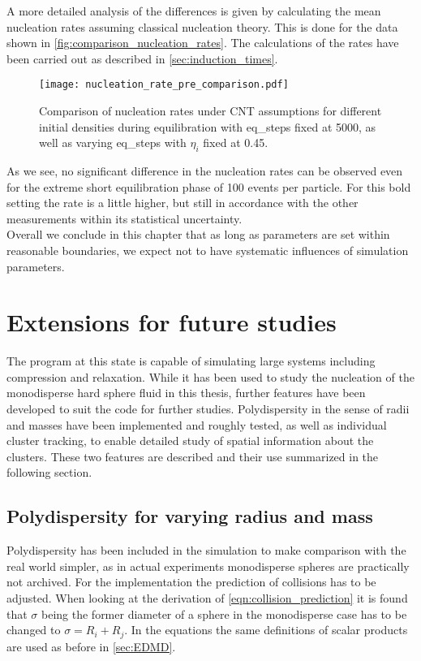 A more detailed analysis of the differences is given by calculating the mean nucleation rates assuming classical nucleation theory. This is done for the data shown in \autoref{fig:comparison_nucleation_rates}. The calculations of the rates have been carried out as described in \autoref{sec:induction_times}.

\begin{figure}[h!]
\centering
\texttt{[image: nucleation\_rate\_pre\_comparison.pdf]}
\caption[Nucleation rates of equilibration test measurements]{Comparison of nucleation rates under CNT assumptions for different initial densities during equilibration with eq\_steps fixed at 5000, as well as varying eq\_steps with $\eta_i$ fixed at 0.45. }
\label{fig:comparison_nucleation_rates}
\end{figure}

As we see, no significant difference in the nucleation rates can be observed even for the extreme short equilibration phase of 100 events per particle. For this bold setting the rate is a little higher, but still in accordance with the other measurements within its statistical uncertainty.\\

Overall we conclude in this chapter that as long as parameters are set within reasonable boundaries, we expect not to have systematic influences of simulation parameters. 

\section{Extensions for future studies}
\label{sec:simulation_ext}
The program at this state is capable of simulating large systems including compression and relaxation. While it has been used to study the nucleation of the monodisperse hard sphere fluid in this thesis, further features have been developed to suit the code for further studies. Polydispersity in the sense of radii and masses have been implemented and roughly tested, as well as individual cluster tracking, to enable detailed study of spatial information about the clusters. These two features are described and their use summarized in the following section.

\subsection{Polydispersity for varying radius and mass}
\label{sec:extension_radius}
Polydispersity has been included in the simulation to make comparison with the real world simpler, as in actual experiments monodisperse spheres are practically not archived. For the implementation the prediction of collisions has to be adjusted. When looking at the derivation of \autoref{eqn:collision_prediction} it is found that $\sigma$ being the former diameter of a sphere in the monodisperse case has to be changed to $\sigma=R_i+R_j$. In the equations the same definitions of scalar products are used as before in \autoref{sec:EDMD}.

